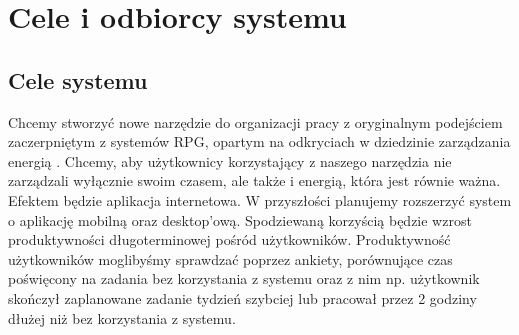 \documentclass[a4paper,11pt]{report}
\begin{document}
\section {Cele i odbiorcy systemu}
\subsection {Cele systemu}
Chcemy stworzyć nowe narzędzie do organizacji pracy z oryginalnym podejściem zaczerpniętym z systemów RPG,
 opartym na odkryciach w dziedzinie zarządzania energią \cite{Harward}.
 Chcemy, aby użytkownicy korzystający z naszego narzędzia nie zarządzali wyłącznie swoim czasem,
 ale także i energią, która jest równie ważna. Efektem będzie aplikacja internetowa.
 W przyszłości planujemy rozszerzyć system o aplikację mobilną oraz desktop'ową.
 Spodziewaną korzyścią będzie wzrost produktywności długoterminowej pośród użytkowników.
 Produktywność użytkowników moglibyśmy sprawdzać poprzez ankiety,
 porównujące czas poświęcony na zadania bez korzystania z systemu oraz z nim np. użytkownik skończył
 zaplanowane zadanie tydzień szybciej lub pracował przez 2 godziny dłużej niż bez korzystania z systemu.\\
\end{document}
